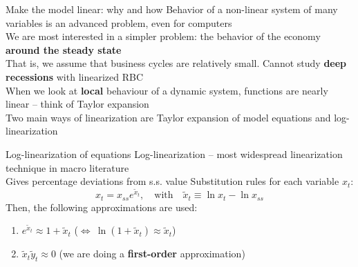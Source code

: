 \documentclass{beamer}
\newcommand{\tms}[1]{{\color{mint}{#1}}}
\begin{document}
\begin{frame}{Make the model linear: why and how}
Behavior of a non-linear system of many variables is an advanced problem, even for computers \\ \vfill 
    We are most interested in a simpler problem: the behavior of the economy \textbf{around the steady state} \\ \vfill
    That is, we assume that business cycles are relatively small. Cannot study \textbf{deep recessions} with linearized RBC 
    \\ \vfill
    When we look at \textbf{local} behaviour of a dynamic system, functions are nearly linear -- think of Taylor expansion \\ \vfill
    Two main ways of linearization are Taylor expansion of model equations and log-linearization
\end{frame}

\begin{frame}{Log-linearization of equations}
  Log-linearization -- most widespread linearization technique in macro literature \\ \vfill
  Gives percentage deviations from s.s. value \tms{(like percentage deviations from trend, Lec. 6)}
  \vfill
  Substitution rules for each variable $x_t$: 
  $$x_t = x_{ss} e^{\tilde x_t}, \quad \text{with} \quad \tilde x_t \equiv \ln x_t - \ln x_{ss}$$ 
  \vfill
  Then, the following approximations are used:
  \begin{enumerate}
	\item $e^{\tilde x_t} \approx 1 + \tilde x_t$ ($\Leftrightarrow \ \ln (1+\tilde x_t) \approx \tilde x_t$)
	\item $\tilde x_t \tilde y_t \approx 0$  (we are doing a \textbf{first-order} approximation) 
  \end{enumerate}

\end{frame}
\end{document}
